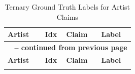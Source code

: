 \begin{center} 
\begin{longtable}{p{3cm}cp{7cm}p{3cm}} %
\caption{Ternary Ground Truth Labels for Artist Claims} \label{tab:ground_truth_labels} \\
\toprule
\textbf{Artist} & \textbf{Idx} & \textbf{Claim} & \textbf{Label} \\
\midrule
\endfirsthead

\multicolumn{4}{c}{{\bfseries \tablename\ \thetable{} -- continued from previous page}} \\ %
\toprule
\textbf{Artist} & \textbf{Idx} & \textbf{Claim} & \textbf{Label} \\
\midrule
\endhead

\bottomrule
\endfoot

\bottomrule
\endlastfoot


\end{longtable}
\end{center}
